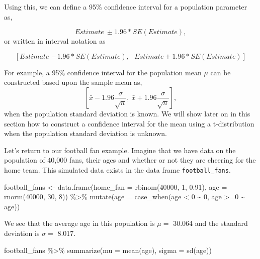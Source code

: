 \documentclass[
  letterpaper,
  DIV=11,
  numbers=noendperiod]{scrreprt}
\newenvironment{Shaded}{\begin{snugshade}}{\end{snugshade}}
\newcommand{\AttributeTok}[1]{\textcolor[rgb]{0.40,0.45,0.13}{#1}}
\newcommand{\DecValTok}[1]{\textcolor[rgb]{0.68,0.00,0.00}{#1}}
\newcommand{\FloatTok}[1]{\textcolor[rgb]{0.68,0.00,0.00}{#1}}
\newcommand{\FunctionTok}[1]{\textcolor[rgb]{0.28,0.35,0.67}{#1}}
\newcommand{\NormalTok}[1]{\textcolor[rgb]{0.00,0.23,0.31}{#1}}
\newcommand{\OtherTok}[1]{\textcolor[rgb]{0.00,0.23,0.31}{#1}}
\newcommand{\SpecialCharTok}[1]{\textcolor[rgb]{0.37,0.37,0.37}{#1}}
\theoremstyle{definition}
\theoremstyle{remark}
\begin{document}
Using this, we can define a 95\% confidence interval for a population
parameter as,

\[Estimate \ \pm 1.96*SE(Estimate),\] or written in interval notation as

\[[Estimate \ \ – \ 1.96*SE(Estimate),\ \ \ Estimate + 1.96*SE(Estimate)]\]

For example, a 95\% confidence interval for the population mean \(\mu\)
can be constructed based upon the sample mean as,
\[[\bar{x} - 1.96\frac{\sigma}{\sqrt{n}}, \ \bar{x} + 1.96\frac{\sigma}{\sqrt{n}}],\]
when the population standard deviation is known. We will show later on
in this section how to construct a confidence interval for the mean
using a t-distribution when the population standard deviation is
unknown.

Let's return to our football fan example. Imagine that we have data on
the population of 40,000 fans, their ages and whether or not they are
cheering for the home team. This simulated data exists in the data frame
\texttt{football\_fans}.

\begin{Shaded}
\begin{Highlighting}[]
\NormalTok{football\_fans }\OtherTok{\textless{}{-}} \FunctionTok{data.frame}\NormalTok{(}\AttributeTok{home\_fan =} \FunctionTok{rbinom}\NormalTok{(}\DecValTok{40000}\NormalTok{, }\DecValTok{1}\NormalTok{, }\FloatTok{0.91}\NormalTok{),}
                            \AttributeTok{age =} \FunctionTok{rnorm}\NormalTok{(}\DecValTok{40000}\NormalTok{, }\DecValTok{30}\NormalTok{, }\DecValTok{8}\NormalTok{)) }\SpecialCharTok{\%\textgreater{}\%}
  \FunctionTok{mutate}\NormalTok{(}\AttributeTok{age =} \FunctionTok{case\_when}\NormalTok{(age }\SpecialCharTok{\textless{}} \DecValTok{0} \SpecialCharTok{\textasciitilde{}} \DecValTok{0}\NormalTok{,}
\NormalTok{                         age }\SpecialCharTok{\textgreater{}=}\DecValTok{0} \SpecialCharTok{\textasciitilde{}}\NormalTok{ age))}
\end{Highlighting}
\end{Shaded}

We see that the average age in this population is \(\mu =\) 30.064 and
the standard deviation is \(\sigma =\) 8.017.

\begin{Shaded}
\begin{Highlighting}[]
\NormalTok{football\_fans }\SpecialCharTok{\%\textgreater{}\%} 
  \FunctionTok{summarize}\NormalTok{(}\AttributeTok{mu =} \FunctionTok{mean}\NormalTok{(age),}
            \AttributeTok{sigma =} \FunctionTok{sd}\NormalTok{(age))}
\end{Highlighting}
\end{Shaded}
\end{document}
